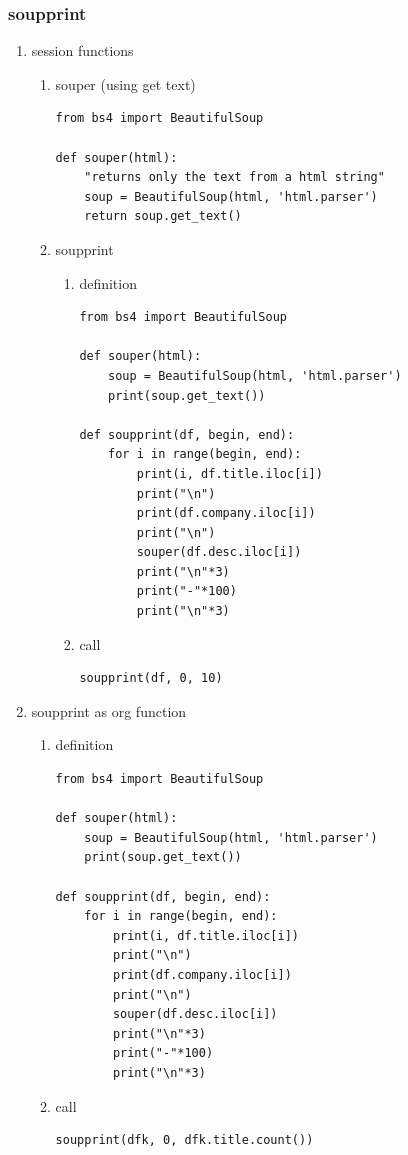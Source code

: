 \documentclass[11pt]{article}
\begin{document}
\subsubsection{soupprint}
\label{sec:org7f4c600}
\begin{enumerate}
\item session functions
\label{sec:orgc8710e7}
\begin{enumerate}
\item souper (using get text)
\label{sec:org5321dca}
\begin{verbatim}
from bs4 import BeautifulSoup

def souper(html):
    "returns only the text from a html string"
    soup = BeautifulSoup(html, 'html.parser')
    return soup.get_text()
\end{verbatim}
\item soupprint
\label{sec:orge2e8da7}
\begin{enumerate}
\item definition
\label{sec:org40d7f0d}
\begin{verbatim}
from bs4 import BeautifulSoup

def souper(html):
    soup = BeautifulSoup(html, 'html.parser')
    print(soup.get_text())

def soupprint(df, begin, end):
    for i in range(begin, end):
        print(i, df.title.iloc[i])
        print("\n")
        print(df.company.iloc[i])
        print("\n")
        souper(df.desc.iloc[i])
        print("\n"*3)
        print("-"*100)
        print("\n"*3)
\end{verbatim}
\item call
\label{sec:org047461c}
\begin{verbatim}
soupprint(df, 0, 10)
\end{verbatim}
\end{enumerate}
\end{enumerate}

\item soupprint as org function
\label{sec:org8ace7ef}
\begin{enumerate}
\item definition
\label{sec:org9d7b05f}
\begin{verbatim}
from bs4 import BeautifulSoup

def souper(html):
    soup = BeautifulSoup(html, 'html.parser')
    print(soup.get_text())

def soupprint(df, begin, end):
    for i in range(begin, end):
        print(i, df.title.iloc[i])
        print("\n")
        print(df.company.iloc[i])
        print("\n")
        souper(df.desc.iloc[i])
        print("\n"*3)
        print("-"*100)
        print("\n"*3)
\end{verbatim}

\item call
\label{sec:org7d6806d}
\begin{verbatim}
soupprint(dfk, 0, dfk.title.count())
\end{verbatim}
\end{enumerate}
\end{enumerate}
\end{document}
